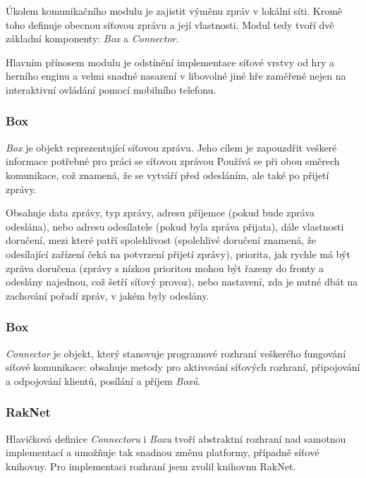 \documentclass[thesis=B,czech,hidelinks]{FITthesis}[2012/06/26] %
\begin{document}
Úkolem komunikačního modulu je zajistit výměnu zpráv v lokální síti. Kromě toho definuje obecnou síťovou zprávu a její vlastnosti. Modul tedy tvoří dvě základní komponenty: \textit{Box} a \textit{Connector}. 

Hlavním přínosem modulu je odstínění implementace síťové vrstvy od hry a herního enginu a velmi snadné nasazení v libovolné jiné hře zaměřené nejen na interaktivní ovládání pomocí mobilního telefonu.


\subsubsection{Box}

\textit{Box} je objekt reprezentující síťovou zprávu. Jeho cílem je zapouzdřit veškeré informace potřebné pro práci se síťovou zprávou Používá se při obou směrech komunikace, což znamená, že se vytváří před odesláním, ale také po přijetí zprávy.

Obsahuje data zprávy, typ zprávy, adresu příjemce (pokud bude zpráva odeslána), nebo adresu odesílatele (pokud byla zpráva přijata), dále vlastnosti doručení, mezi které patří spolehlivost (spolehlivé doručení znamená, že odesílající zařízení čeká na potvrzení přijetí zprávy), priorita, jak rychle má být zpráva doručena (zprávy s nízkou prioritou mohou být řazeny do fronty a odeslány najednou, což šetří síťový provoz), nebo nastavení, zda je nutné dbát na zachování pořadí zpráv, v jakém byly odeslány.

\subsubsection{Box}

\textit{Connector} je objekt, který stanovuje programové rozhraní veškerého fungování síťové komunikace: obsahuje metody pro aktivování síťových rozhraní, připojování a odpojování klientů, posílání a příjem \textit{Boxů}. 

\subsubsection{RakNet}

Hlavičková definice \textit{Connectoru} i \textit{Boxu} tvoří abstraktní rozhraní nad samotnou implementací a umožňuje tak snadnou změnu platformy, případně síťové knihovny. Pro implementaci rozhraní jsem zvolil knihovnu RakNet.
\end{document}
